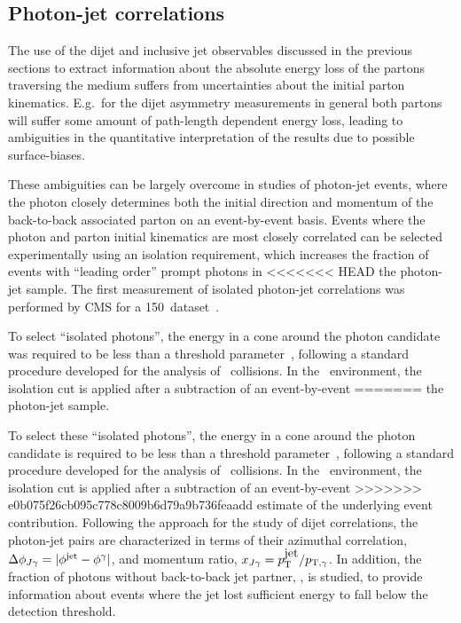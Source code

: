 \subsection{Photon-jet correlations}

The use of the dijet and inclusive jet observables discussed in the previous sections
to extract information
about the absolute energy loss of the partons traversing the medium suffers from
uncertainties about the initial parton kinematics. E.g.\ for the dijet asymmetry
measurements in general both partons will suffer some amount of path-length dependent
energy loss, leading to ambiguities in the quantitative interpretation of the results
due to possible surface-biases.

These ambiguities can be largely overcome in studies of photon-jet events,
where the photon closely determines both the initial direction and momentum
of the back-to-back associated parton on an event-by-event basis.
Events where the photon and parton initial kinematics are most closely correlated
can be selected experimentally using an isolation requirement, which
increases the fraction of events with ``leading order'' prompt photons in
<<<<<<< HEAD
the photon-jet sample. The first measurement of isolated photon-jet correlations
was performed by CMS for a 150\mubinv \PbPb\ dataset~\cite{Chatrchyan:2012gt}.

To select ``isolated photons'', the energy in a cone around 
the photon candidate was required to be less than a threshold parameter~\cite{HIPhoton},
following a standard procedure developed for the analysis of \pp\ collisions. In the \PbPb\ 
environment, the isolation cut is applied after a subtraction of an event-by-event 
=======
the photon-jet sample.

To select these ``isolated photons'', the energy in a cone around
the photon candidate is required to be less than a threshold parameter~\cite{HIPhoton},
following a standard procedure developed for the analysis of \pp\ collisions. In the \PbPb\
environment, the isolation cut is applied after a subtraction of an event-by-event
>>>>>>> e0b075f26cb095c778c8009b6d79a9b736feaadd
estimate of the underlying event contribution.
Following the approach for the study of dijet correlations, the photon-jet pairs
are characterized in terms of their azimuthal correlation, $\Delta\phi_{J\gamma} = |\phi^\mathrm{jet} - \phi^{\gamma}|$,
 and momentum ratio, $x_{J\gamma} = p_{\mathrm{T}}^{\mbox{jet}}/p_{\mathrm{T},\gamma}$. In addition, the fraction of photons without
back-to-back jet partner,  \rjg, is studied, to provide information about
events where the jet lost sufficient energy to fall below the detection threshold.

